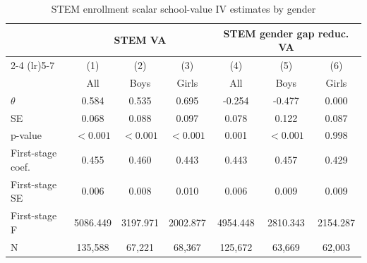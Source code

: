 \begin{table}[!htbp]
\centering
\caption{STEM enrollment scalar school-value IV estimates by gender}
\label{tab:scalar_school_value_iv_stem_gender_results}
\begin{tabular}{lcccccc}
\toprule
 & \multicolumn{3}{c}{STEM VA} & \multicolumn{3}{c}{STEM gender gap reduc. VA} \\
\cmidrule(lr){2-4} \cmidrule(lr){5-7}
 & (1) & (2) & (3) & (4) & (5) & (6) \\
 & All & Boys & Girls & All & Boys & Girls \\
\midrule
$\theta$ & 0.584 & 0.535 & 0.695 & -0.254 & -0.477 & 0.000 \\
SE & 0.068 & 0.088 & 0.097 & 0.078 & 0.122 & 0.087 \\
p-value & $<0.001$ & $<0.001$ & $<0.001$ & 0.001 & $<0.001$ & 0.998 \\
\midrule
First-stage coef. & 0.455 & 0.460 & 0.443 & 0.443 & 0.457 & 0.429 \\
First-stage SE & 0.006 & 0.008 & 0.010 & 0.006 & 0.009 & 0.009 \\
First-stage F & 5086.449 & 3197.971 & 2002.877 & 4954.448 & 2810.343 & 2154.287 \\
N & 135,588 & 67,221 & 68,367 & 125,672 & 63,669 & 62,003 \\
\bottomrule
\end{tabular}
\end{table}

